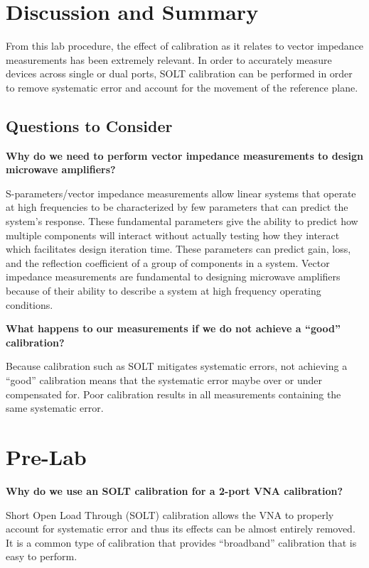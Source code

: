 \documentclass[journal]{IEEEtran}
\begin{document}
\section{Discussion and Summary}

From this lab procedure, the effect of calibration as it relates to vector
impedance measurements has been extremely relevant. In order to accurately
measure devices across single or dual ports, SOLT calibration can be performed
in order to remove systematic error and account for the movement of the reference plane.

\subsection{Questions to Consider}

\textbf{Why do we need to perform vector impedance measurements to design microwave amplifiers?}

S-parameters/vector impedance measurements allow linear systems that operate at
high frequencies to be characterized by few parameters that can predict the
system's response. These fundamental parameters give the ability to predict how
multiple components will interact without actually testing how they interact
which facilitates design iteration time. These parameters  can predict gain,
loss, and the reflection coefficient of a group of components in a system.
Vector impedance measurements are fundamental to designing microwave amplifiers
because of their ability to describe a system at high frequency operating
conditions.

\textbf{What happens to our measurements if we do not achieve a “good” calibration?}

Because calibration such as SOLT mitigates systematic errors, not achieving a
``good'' calibration means that the systematic error maybe over or under
compensated for.  Poor calibration results in all measurements containing the
same systematic error.
\appendices
\section{Pre-Lab}
\textbf{Why do we use an SOLT calibration for a 2-port VNA calibration?}

Short Open Load Through (SOLT) calibration allows the VNA to properly account
for systematic error and thus its effects can be almost entirely removed.  It
is a common type of calibration that provides ``broadband'' calibration that is
easy to perform.
\end{document}
